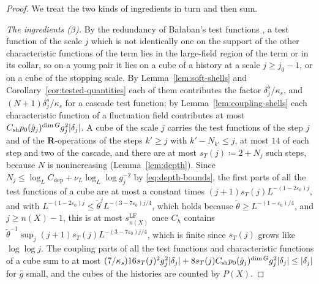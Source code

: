 \documentclass[11pt]{preprint}
\DeclarePairedDelimiter{\abs}{\lvert}{\rvert}
\numberwithin{equation}{section}
\theoremstyle{definition}
\theoremstyle{remark}
\theoremstyle{plain}
\begin{document}
\begin{proof}
We treat the two kinds of ingredients in turn and then sum.

\emph{The ingredients ($\beta$).} By the redundancy of Ba{\l}aban's test functions \cite[(3.6)--(3.9), p.~265--266; p.~268--269]{BalabanCRE}, a test function of the scale $j$ which is not identically one on the support of the other characteristic functions of the term lies in the large-field region of the term or in its collar, so on a young pair it lies on a cube of a history at a scale $j \geq j_0 - 1$, or on a cube of the stopping scale. By Lemma~\ref{lem:soft-shells} and Corollary~\ref{cor:tested-quantities} each of them contributes the factor $\delta^s_j/\kappa_s$, and $(N + 1)\delta^s_j/\kappa_s$ for a cascade test function; by Lemma~\ref{lem:coupling-shells} each characteristic function of a fluctuation field contributes at most $C_{\mathrm{sh}}p_0(\hat g_j)^{\dim G}g_j^2\abs{\delta_j}$. A cube of the scale $j$ carries the test functions of the step $j$ and of the $\mathbf R$-operations of the steps $k' \geq j$ with $k' - N_{k'} \leq j$, at most $14$ of each step and two of the cascade, and there are at most $s_T(j) \coloneqq 2 + N_j$ such steps, because $N$ is nonincreasing (Lemma~\ref{lem:depth}). Since $N_j \leq \log_LC_{\mathrm{dep}} + \nu_L\log_L\log g_j^{-2}$ by \eqref{eq:depth-bounds}, the first parts of all the test functions of a cube are at most a constant times $(j + 1)s_T(j)L^{-(1-2\varepsilon_0)j}$, and with $L^{-(1-2\varepsilon_0)j} \leq \tilde\theta^jL^{-(3-7\varepsilon_0)j/4}$, which holds because $\tilde\theta \geq L^{-(1-\varepsilon_0)/4}$, and $j \geq n(X) - 1$, this is at most $s^{\mathrm{LF}}_{n(X)}$ once $C_h$ contains $\tilde\theta^{-1}\sup_j(j + 1)s_T(j)L^{-(3-7\varepsilon_0)j/4}$, which is finite since $s_T(j)$ grows like $\log\log j$. The coupling parts of all the test functions and characteristic functions of a cube sum to at most $(7/\kappa_s)16s_T(j)^2g_j^2\abs{\delta_j} + 8s_T(j)C_{\mathrm{sh}}p_0(\hat g_j)^{\dim G}g_j^2\abs{\delta_j} \leq \abs{\delta_j}$ for $\bar g$ small, and the cubes of the histories are counted by $P(X)$.


\end{proof}
\end{document}
